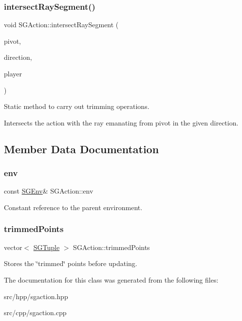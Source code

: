 \subsubsection{\texorpdfstring{intersect\+Ray\+Segment()}{intersectRaySegment()}}
{\footnotesize\ttfamily void S\+G\+Action\+::intersect\+Ray\+Segment (\begin{DoxyParamCaption}\item[{const \hyperlink{classSGPoint}{S\+G\+Point} \&}]{pivot,  }\item[{const \hyperlink{classSGPoint}{S\+G\+Point} \&}]{direction,  }\item[{int}]{player }\end{DoxyParamCaption})}



Static method to carry out trimming operations. 

Intersects the action with the ray emanating from pivot in the given direction. 

\subsection{Member Data Documentation}
\mbox{\label{classSGAction_a5ae60f6fd5a545d13c8a2525d7378b9d}} 
\subsubsection{\texorpdfstring{env}{env}}
{\footnotesize\ttfamily const \hyperlink{classSGEnv}{S\+G\+Env}\& S\+G\+Action\+::env\hspace{0.3cm}{\ttfamily [private]}}

Constant reference to the parent environment. \mbox{\label{classSGAction_a55b3b33f432a0a77c89c40438aa2dd1f}} 
\subsubsection{\texorpdfstring{trimmed\+Points}{trimmedPoints}}
{\footnotesize\ttfamily vector$<$ \hyperlink{classSGTuple}{S\+G\+Tuple} $>$ S\+G\+Action\+::trimmed\+Points\hspace{0.3cm}{\ttfamily [private]}}

Stores the \char`\"{}trimmed\char`\"{} points before updating. 

The documentation for this class was generated from the following files\+:\begin{DoxyCompactItemize}
\item 
src/hpp/sgaction.\+hpp\item 
src/cpp/sgaction.\+cpp\end{DoxyCompactItemize}

